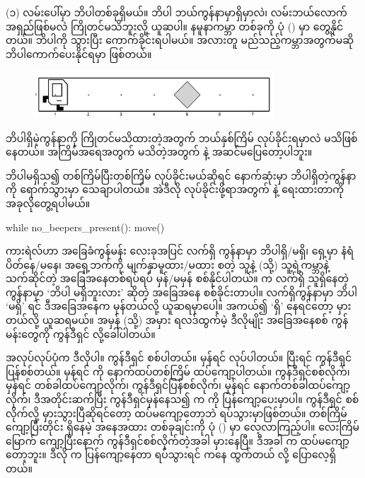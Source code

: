 (၁) လမ်းပေါ်မှာ ဘိပါတစ်ခုရှိမယ်။ ဘိပါ ဘယ်ကွန်နာမှာရှိမှာလဲ၊ လမ်းဘယ်လောက်အရှည်ဖြစ်မလဲ ကြိုတင်မသိဘူးလို့ ယူဆပါ။ နမူနာကမ္ဘာ တစ်ခုကို ပုံ (\fRefNo{\ref{fig:gpb1}}) မှာ တွေ့နိုင်တယ်။ ဘိပါကို သွားပြီး ကောက်ခိုင်းရပါမယ်။ အလားတူ မည်သည့်ကမ္ဘာအတွက်မဆို ဘိပါကောက်ပေးနိုင်ရမှာ ဖြစ်တယ်။
%
\begin{figure}[thb!]
    \includegraphics[width=0.8\textwidth]{images/ch02/gpb/at_fifth.jpg}
    \caption{}\label{fig:gpb1}
\end{figure}
%
ဘိပါရှိမဲ့ကွန်နာကို ကြိုတင်မသိထားတဲ့အတွက် ဘယ်နှစ်ကြိမ်  လုပ်ခိုင်းရမှာလဲ မသိဖြစ်နေတယ်။ အကြိမ်အရေအတွက် မသိတဲ့အတွက်   နဲ့ အဆင်မပြေတော့ပါဘူး။

ဘိပါမရှိသ၍ တစ်ကြိမ်ပြီးတစ်ကြိမ်  လုပ်ခိုင်းမယ်ဆိုရင် နောက်ဆုံးမှာ ဘိပါရှိတဲ့ကွန်နာကို ရောက်သွားမှာ သေချာပါတယ်။ အဲဒီလို လုပ်ခိုင်းဖို့ရာအတွက်   နဲ့ ရေးထားတာကို အခုလိုတွေ့ရပါမယ်။
%
\begin{py}
while no_beepers_present():
    move()
\end{py}
%

ကားရဲလ်ဟာ အခြေခံကွန်မန်း လေးခုအပြင် လက်ရှိ ကွန်နာမှာ ဘိပါရှိ/မရှိ၊ ရှေ့မှာ နံရံပိတ်နေ/မနေ၊ အရှေ့ဘက်ကို မျက်နှာမူထား/မထား စတဲ့ သူနဲ့ (သို့) သူ့ရဲ့ကမ္ဘာနဲ့ သက်ဆိုင်တဲ့ အခြေအနေတစ်ရပ်ရပ် မှန်/မမှန် စစ်နိုင်ပါတယ်။  က လက်ရှိ သူရှိနေတဲ့ ကွန်နာမှာ ‘ဘိပါ မရှိဘူးလား’ ဆိုတဲ့ အခြေအနေ စစ်ခိုင်းတာပါ။ လက်ရှိကွန်နာမှာ ဘိပါ ‘မရှိ’ ရင် ဒီအခြေအနေက မှန်တယ်လို့ ယူဆရမှာပေါ့။ အကယ်၍ ‘ရှိ’ နေရင်တော့ မှားတယ်လို့ ယူဆရမယ်။ အမှန် (သို့) အမှား ရလဒ်ထွက်မဲ့ ဒီလိုမျိုး အခြေအနေစစ် ကွန်မန်းတွေကို  ကွန်ဒီရှင်  လို့ခေါ်ပါတယ်။

  အလုပ်လုပ်ပုံက ဒီလိုပါ။  ကွန်ဒီရှင် စစ်ပါတယ်။ မှန်ရင်   လုပ်ပါတယ်။ ပြီးရင် ကွန်ဒီရှင်ပြန်စစ်တယ်။ မှန်ရင်  ကို နောက်ထပ်တစ်ကြိမ် ထပ်ကျော့ပါတယ်။ ကွန်ဒီရှင်စစ်လိုက်၊ မှန်ရင် တစ်ခါထပ်ကျော့လိုက်၊ ကွန်ဒီရှင်ပြန်စစ်လိုက်၊ မှန်ရင် နောက်တစ်ခါထပ်ကျော့လိုက်၊  ဒီအတိုင်းဆက်ပြီး ကွန်ဒီရှင်မှန်နေသ၍   က  ကို ပြန်ကျော့ပေးမှာပါ။ ကွန်ဒီရှင် စစ်လိုက်လို့ မှားသွားပြီဆိုရင်တော့ ထပ်မကျော့တော့ဘဲ ရပ်သွားမှာဖြစ်တယ်။    တစ်ကြိမ်ကျော့ပြီးတိုင်း ရှိနေမဲ့ အနေအထား တစ်ခုချင်းကို ပုံ (\fRefNo{\ref{fig:gpb_iters}})  မှာ  လေ့လာကြည့်ပါ။ လေးကြိမ်မြောက် ကျော့ပြီးနောက်  ကွန်ဒီရှင်စစ်လိုက်တဲ့အခါ မှားနေပြီ။ ဒီအခါ    က ထပ်မကျော့တော့ဘူး။ ဒီလို  က ပြန်ကျော့နေတာ ရပ်သွားရင်  ကနေ ထွက်တယ်  လို့ ပြောလေ့ရှိတယ်။ 

